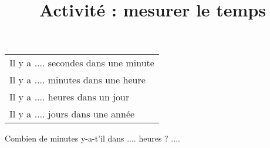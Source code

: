 \documentclass[a4paper,12pt]{beamer}
\title{Activité : mesurer le temps}
\date{}
\author{}
\begin{document}
\begin{frame}
\begin{center}
\begin{tabular}{l}
	Il y a .... secondes dans une minute \\
	Il y a .... minutes dans une heure   \\
	Il y a .... heures dans un jour      \\
	Il y a .... jours dans une année     \\
\end{tabular} \vspace{1em}

Combien de minutes y-a-t'il dans .... heures ? ....
\end{center}
\end{frame}
\end{document}
